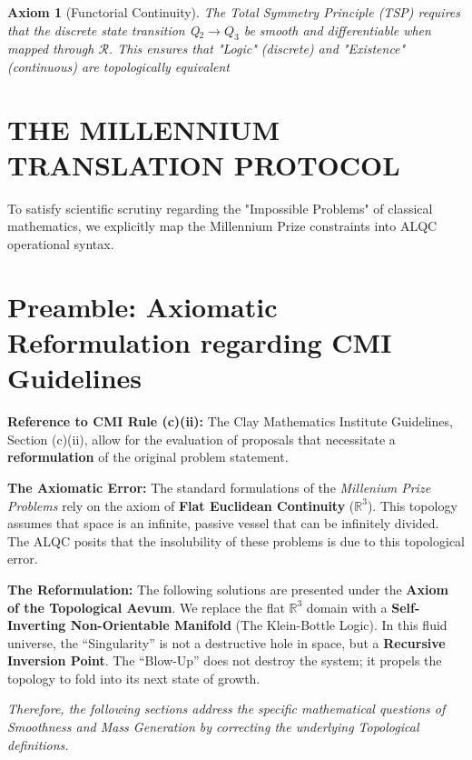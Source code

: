 \documentclass[12pt]{amsart}
\newtheorem{axiom}[theorem]{Axiom}
\begin{document}
\begin{axiom}[Functorial Continuity]
The Total Symmetry Principle (TSP) requires that the discrete state transition Q$_2 \to Q_3$ be smooth and differentiable when mapped through $\mathcal{R}$. This ensures that "Logic" (discrete) and "Existence" (continuous) are topologically equivalent
\end{axiom}

\newpage
\section{THE MILLENNIUM TRANSLATION PROTOCOL}\label{sec:partVII}

To satisfy scientific scrutiny regarding the "Impossible Problems" of classical mathematics, we explicitly map the Millennium Prize constraints into ALQC operational syntax.

\section*{Preamble: Axiomatic Reformulation regarding CMI Guidelines}\label{sec:1}

\noindent \textbf{Reference to CMI Rule (c)(ii):}
The Clay Mathematics Institute Guidelines, Section (c)(ii), allow for the evaluation of proposals that necessitate a \textbf{reformulation} of the original problem statement.

\noindent \textbf{The Axiomatic Error:}
The standard formulations of the \textit{Millenium Prize Problems} rely on the axiom of \textbf{Flat Euclidean Continuity} ($\mathbb{R}^3$). This topology assumes that space is an infinite, passive vessel that can be infinitely divided. The ALQC posits that the insolubility of these problems is due to this topological error.

\noindent \textbf{The Reformulation:}
The following solutions are presented under the \textbf{Axiom of the Topological Aevum}. We replace the flat $\mathbb{R}^3$ domain with a \textbf{Self-Inverting Non-Orientable Manifold} (The Klein-Bottle Logic). In this fluid universe, the ``Singularity'' is not a destructive hole in space, but a \textbf{Recursive Inversion Point}. The ``Blow-Up'' does not destroy the system; it propels the topology to fold into its next state of growth.

\noindent \textit{Therefore, the following sections address the specific mathematical questions of Smoothness and Mass Generation by correcting the underlying Topological definitions.}
\end{document}
